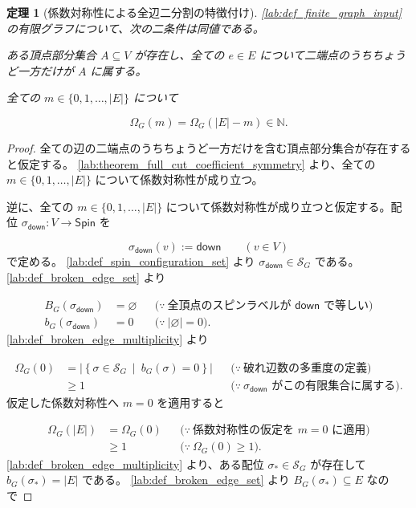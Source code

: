 \documentclass[11pt,a4paper]{article}
\newtheorem{theorem}[definition]{定理}
\theoremstyle{remark}
\begin{document}
\begin{theorem}[係数対称性による全辺二分割の特徴付け]\label{lab:theorem_coefficient_symmetry_characterizes_full_cut}
\cref{lab:def_finite_graph_input}
 の有限グラフについて、次の二条件は同値である。

ある頂点部分集合 
$A\subseteq V$
 が存在し、全ての 
$e\in E$
 について二端点のうちちょうど一方だけが 
$A$
 に属する。

全ての 
$m\in\{0,1,\ldots,|E|\}$
 について

\[\Omega_G(m)=\Omega_G(|E|-m)\in\mathbb N.\]
\end{theorem}
\begin{proof}
全ての辺の二端点のうちちょうど一方だけを含む頂点部分集合が存在すると仮定する。
\cref{lab:theorem_full_cut_coefficient_symmetry}
 より、全ての 
$m\in\{0,1,\ldots,|E|\}$
 について係数対称性が成り立つ。

逆に、全ての 
$m\in\{0,1,\ldots,|E|\}$
 について係数対称性が成り立つと仮定する。配位 
$\sigma_{\mathsf{down}}:V\to\mathsf{Spin}$
 を

\[\sigma_{\mathsf{down}}(v):=\mathsf{down}
\qquad(v\in V)\]
で定める。
\cref{lab:def_spin_configuration_set}
 より 
$\sigma_{\mathsf{down}}\in\mathcal S_G$
 である。
\cref{lab:def_broken_edge_set}
 より

\[\begin{aligned}
B_G(\sigma_{\mathsf{down}})
&=\varnothing
&&\bigl(\because\ \text{全頂点のスピンラベルが }\mathsf{down}\text{ で等しい}\bigr)\\
b_G(\sigma_{\mathsf{down}})
&=0
&&\bigl(\because\ |\varnothing|=0\bigr).
\end{aligned}\]
\cref{lab:def_broken_edge_multiplicity}
 より

\[\begin{aligned}
\Omega_G(0)
&=\left|\left\{\sigma\in\mathcal S_G\ \middle|\ b_G(\sigma)=0\right\}\right|
&&\bigl(\because\ \text{破れ辺数の多重度の定義}\bigr)\\
&\ge 1
&&\bigl(\because\ \sigma_{\mathsf{down}}\text{ がこの有限集合に属する}\bigr).
\end{aligned}\]
仮定した係数対称性へ 
$m=0$
 を適用すると

\[\begin{aligned}
\Omega_G(|E|)
&=\Omega_G(0)
&&\bigl(\because\ \text{係数対称性の仮定を }m=0\text{ に適用}\bigr)\\
&\ge 1
&&\bigl(\because\ \Omega_G(0)\ge 1\bigr).
\end{aligned}\]
\cref{lab:def_broken_edge_multiplicity}
 より、ある配位 
$\sigma_*\in\mathcal S_G$
 が存在して 
$b_G(\sigma_*)=|E|$
 である。
\cref{lab:def_broken_edge_set}
 より 
$B_G(\sigma_*)\subseteq E$
 なので


\end{proof}
\end{document}
